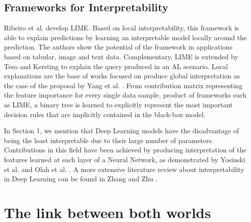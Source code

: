\subsection{Frameworks for Interpretability}

Ribeiro et al. \cite{Ribeiro2016} develop LIME. Based on local interpretability, this framework is able to explain predictions by learning an interpretable model locally around the prediction. The authors show the potential of the framework in applications based on tabular, image and text data. Complementary, LIME is extended by Teso and Kersting \cite{Teso2018WhyUsers} to explain the query produced in an AL scenario. Local explanations are the base of works focused on produce global interpretation as the case of the proposal by Yang et al. \cite{Yang2018GlobalPartitioning}. From contribution matrix representing the feature importance for every single data sample, product of frameworks such as LIME, a binary tree is learned to explicitly represent the most important decision rules that are implicitly contained in the black-box model. 

In Section 1, we mention that Deep Learning models have the disadvantage of being the least interpretable due to their large number of parameters. Contributions in this field have been achieved by producing interpretation of the features learned at each layer of a Neural Network, as demonstrated by Yosinski et al. \cite{Yosinski2015a} and Olah et al. \cite{Olah2018TheInterpretability}. A more extensive literature review about interpretability in Deep Learning can be found in Zhang and Zhu \cite{Zhang2018VisualSurvey}.

\section{The link between both worlds} %
\label{section2.3}

